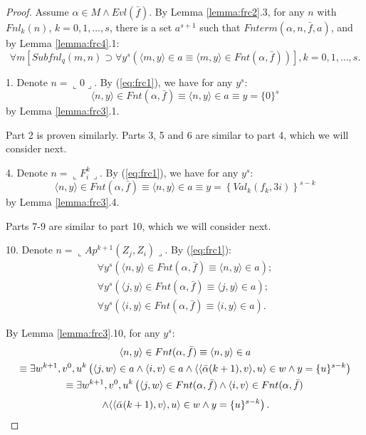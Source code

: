 \documentclass{asl}
\theoremstyle{definition}
\begin{document}
\begin{proof}
Assume $\alpha\in M\wedge Evl(\bar{f})$. By Lemma \ref{lemma:frc2}.3, for any $n$ with $Fnl_k(n)$, $k=0,1,\ldots,s$, there is a set $a^{s+1}$ such that $Fnterm(\alpha,n,\bar{f},a)$, and by Lemma \ref{lemma:frc4}.1:
\begin{equation}
\forall m\left[Subfnl_q(m,n)\supset
\forall y^s\left( \langle m,y\rangle\in a
\equiv\langle m,y\rangle\in Fnt(\alpha,\bar{f})\right)\right], k=0,1,\ldots,s.
\label{eq:frc1}
\end{equation}

1. Denote $n=\llcorner 0\lrcorner$. By (\ref{eq:frc1}), we have for any $y^s$:
\[\langle n,y\rangle\in Fnt(\alpha,\bar{f})\equiv\langle n,y\rangle\in a\equiv y=\lbrace 0\rbrace^s
\]
by Lemma \ref{lemma:frc3}.1.

Part 2 is proven similarly. Parts 3, 5 and 6 are similar to part 4, which we will consider next.

4. Denote $n=\llcorner F_i^k\lrcorner$. By (\ref{eq:frc1}), we have for any $y^s$:
\[\langle n,y\rangle\in Fnt(\alpha,\bar{f})\equiv\langle n,y\rangle\in a\equiv y=\left\lbrace Val_k(f_k,3i) \right\rbrace^{s-k}\]
by Lemma \ref{lemma:frc3}.4.

Parts 7-9 are similar to part 10, which we will consider next.

10. Denote $n=\llcorner Ap^{k+1}(Z_j,Z_i)\lrcorner$. By (\ref{eq:frc1}):
\begin{eqnarray*}
\forall y^s\left( \langle n,y\rangle\in Fnt(\alpha,\bar{f})\equiv \langle n,y\rangle\in a\right);
\\
\forall y^s\left( \langle j,y\rangle\in Fnt(\alpha,\bar{f})\equiv \langle j,y\rangle\in a\right);
\\
\forall y^s\left( \langle i,y\rangle\in Fnt(\alpha,\bar{f})\equiv \langle i,y\rangle\in a\right).
\end{eqnarray*}

By Lemma \ref{lemma:frc3}.10, for any $y^s$:
\begin{multline*}
\langle n,y\rangle\in Fnt(\alpha,\bar{f})\equiv\langle n,y\rangle\in a
\\
\equiv \exists w^{k+1}, v^0,u^{k}
\left(\langle j,w\rangle\in a
\wedge \langle i,v\rangle\in a\wedge
\langle\langle\bar{\alpha}(k+1),v\rangle,u\rangle\in w
\wedge y=\lbrace u\rbrace^{s-k}\right)
\\
\equiv \exists w^{k+1}, v^0,u^{k}
\left(\langle j,w\rangle\in Fnt(\alpha,\bar{f})
\wedge 
\langle i,v\rangle\in Fnt(\alpha,\bar{f})
\right.
\smallskip
\\
\left.
\wedge
\langle\langle\bar{\alpha}(k+1),v\rangle,u\rangle\in w
\wedge y=\lbrace u\rbrace^{s-k}\right).
\end{multline*}
\end{proof}
\end{document}
